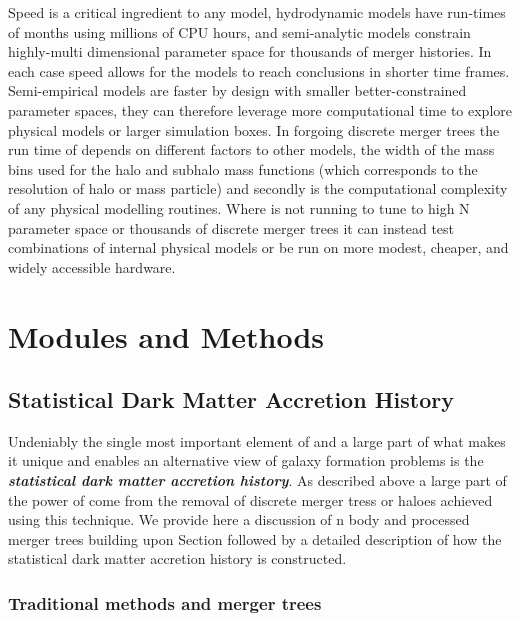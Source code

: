 Speed is a critical ingredient to any model, hydrodynamic models have run-times of months using millions of CPU hours, and semi-analytic models constrain highly-multi dimensional parameter space for thousands of merger histories. In each case speed allows for the models to reach conclusions in shorter time frames. Semi-empirical models are faster by design with smaller better-constrained parameter spaces, they can therefore leverage more computational time to explore physical models or larger simulation boxes. In forgoing discrete merger trees the run time of \steel depends on different factors to other models, the width of the mass bins used for the halo and subhalo mass functions (which corresponds to the resolution of halo or mass particle) and secondly is the computational complexity of any physical modelling routines. Where \steel is not running to tune to high N parameter space or thousands of discrete merger trees it can instead test combinations of internal physical models or be run on more modest, cheaper, and widely accessible hardware.

\section{Modules and Methods}

\subsection{Statistical Dark Matter Accretion History}
\label{subsec:SDMAH}

Undeniably the single most important element of \steel and a large part of what makes it unique and enables an alternative view of galaxy formation problems is the \textbf{\textit{statistical dark matter accretion history}}. As described above a large part of the power of \steel come from the removal of discrete merger tress or haloes achieved using this technique. We provide here a discussion of n body and processed merger trees building upon Section \label{sec:LCDM} followed by a detailed description of how the statistical dark matter accretion history is constructed.

\subsubsection{Traditional methods and merger trees}



